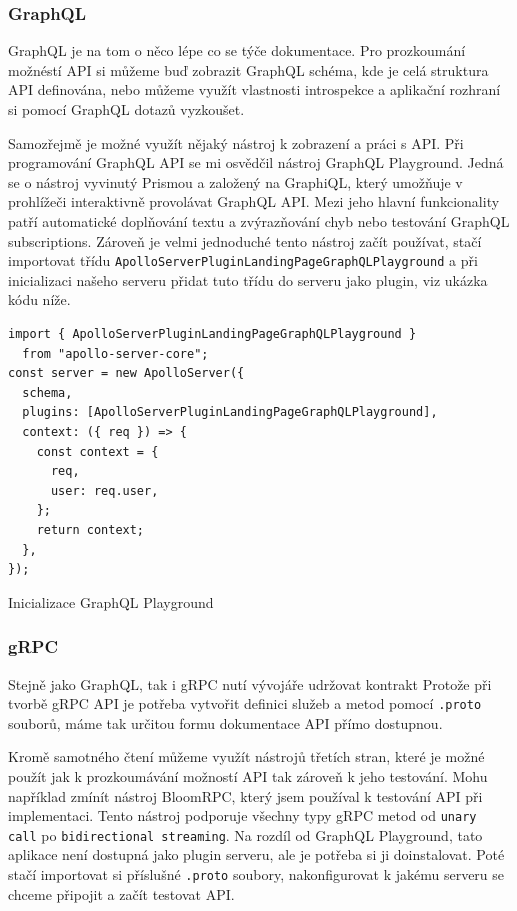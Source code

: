 \documentclass[thesis=M,czech]{FITthesis}[2019/12/23]
\begin{document}
\subsubsection*{GraphQL}
GraphQL je na tom o něco lépe co se týče dokumentace. Pro prozkoumání možnéstí API si můžeme buď zobrazit GraphQL schéma, kde je celá struktura API definována, nebo můžeme využít vlastnosti introspekce a aplikační rozhraní si pomocí GraphQL dotazů vyzkoušet.

Samozřejmě je možné využít nějaký nástroj k zobrazení a práci s API. Při programování GraphQL API se mi osvědčil nástroj GraphQL Playground. %
Jedná se o nástroj vyvinutý Prismou a založený na GraphiQL, který umožňuje v prohlížeči interaktivně provolávat GraphQL API. Mezi jeho hlavní funkcionality patří automatické doplňování textu a zvýrazňování chyb nebo testování GraphQL subscriptions. Zároveň je velmi jednoduché tento nástroj začít používat, stačí importovat třídu \texttt{ApolloServerPluginLandingPageGraphQLPlayground} a při inicializaci našeho serveru přidat tuto třídu do serveru jako plugin, viz ukázka kódu níže.

\begin{listing}[H]
\begin{verbatim}
import { ApolloServerPluginLandingPageGraphQLPlayground }
  from "apollo-server-core";
const server = new ApolloServer({
  schema,
  plugins: [ApolloServerPluginLandingPageGraphQLPlayground],
  context: ({ req }) => {
    const context = {
      req,
      user: req.user,
    };
    return context;
  },
});
\end{verbatim}
\caption{Inicializace GraphQL Playground}
\label{lst:graphql_playground}
\end{listing}

\subsubsection*{gRPC}
Stejně jako GraphQL, tak i gRPC nutí vývojáře udržovat kontrakt 
Protože při tvorbě gRPC API je potřeba vytvořit definici služeb a metod pomocí \texttt{.proto} souborů, máme tak určitou formu dokumentace API přímo dostupnou.

Kromě samotného čtení můžeme využít nástrojů třetích stran, které je možné použít jak k prozkoumávání možností API tak zároveň k jeho testování. Mohu například zmínít nástroj BloomRPC, %
který jsem používal k testování API při implementaci. Tento nástroj podporuje všechny typy gRPC metod od \texttt{unary call} po \texttt{bidirectional streaming}. Na rozdíl od GraphQL Playground, tato aplikace není dostupná jako plugin serveru, ale je potřeba si ji doinstalovat. Poté stačí importovat si příslušné \texttt{.proto} soubory, nakonfigurovat k jakému serveru se chceme připojit a začít testovat API.
\end{document}

